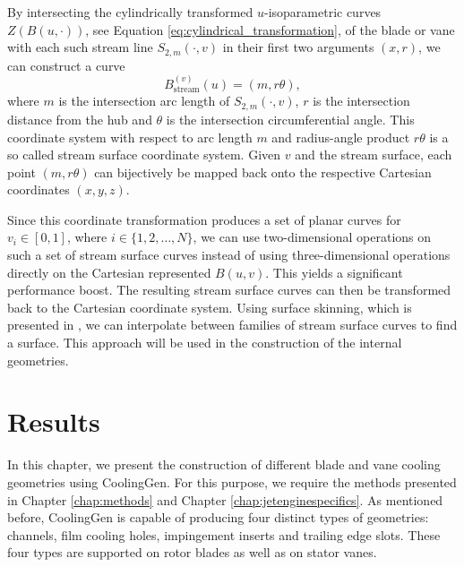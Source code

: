 \documentclass[a4paper, 11pt]{report}
\theoremstyle{definition}
\begin{document}
	By intersecting the cylindrically transformed $u$-isoparametric curves $Z(B(u,\cdot))$, see Equation \ref{eq:cylindrical_transformation}, of the blade or vane with each such stream line $S_{2,m}(\cdot, v)$ in their first two arguments $(x,r)$, we can construct a curve
		$$ B^{(v)}_\textrm{stream}(u) = (m, r\theta),$$
	where $m$ is the intersection arc length of $S_{2,m}(\cdot, v)$, $r$ is the intersection distance from the hub and $\theta$ is the intersection circumferential angle. This coordinate system with respect to arc length $m$ and radius-angle product $r\theta$ is a so called stream surface coordinate system. Given $v$ and the stream surface, each point $(m, r\theta)$ can bijectively be mapped back onto the respective Cartesian coordinates $(x, y, z)$.

	Since this coordinate transformation produces a set of planar curves for $v_i \in [0,1]$, where $i \in \{1, 2, \ldots, N\}$, we can use two-dimensional operations on such a set of stream surface curves instead of using three-dimensional operations directly on the Cartesian represented $B(u,v)$. This yields a significant performance boost. The resulting stream surface curves can then be transformed back to the Cartesian coordinate system. Using surface skinning, which is presented in \cite{Piegl1997}, we can interpolate between families of stream surface curves to find a surface. This approach will be used in the construction of the internal geometries.

\chapter{Results}\label{chap:results}
	In this chapter, we present the construction of different blade and vane cooling geometries using CoolingGen. For this purpose, we require the methods presented in Chapter \ref{chap:methods} and Chapter \ref{chap:jetenginespecifics}. As mentioned before, CoolingGen is capable of producing four distinct types of geometries: channels, film cooling holes, impingement inserts and trailing edge slots. These four types are supported on rotor blades as well as on stator vanes.
 	
\end{document}
